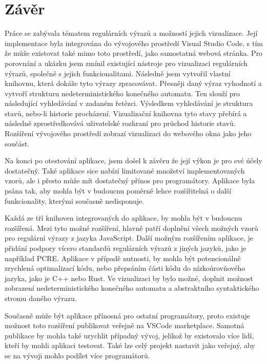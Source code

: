 \chapter{Závěr}\label{sec:Conclusion}

Práce se zabývala tématem regulárních výrazů a možností jejich vizualizace.
Její implementace byla integrována do vývojového prostředí Visual Studio Code, s tím že může existovat také mimo toto prostředí, jako samostatná webová stránka.
Pro porovnání a ukázku jsem zmínil existující nástroje pro vizualizaci regulárních výrazů, společně s jejich funkcionalitami.
Následně jsem vytvořil vlastní knihovnu, která dokáže tyto výrazy zpracovávat.
Přesněji daný výraz vyhodnotí a vytvoří strukturu nedeterministického konečného automatu.
Ten slouží pro následující vyhledávání v zadaném řetězci.
Výsledkem vyhledávání je struktura stavů, nebo-li historie procházení.
Vizualizační knihovna tyto stavy přebírá a následně zprostředkovává uživatelské rozhraní pro průchod historie stavů.
Rozšíření vývojového prostředí zobrazí vizualizaci do webového okna jako jeho součást.

Na konci po otestování aplikace, jsem došel k závěru že její výkon je pro své účely dostatečný.
Také aplikace sice nabízí limitované množství implementovaných vzorů, ale i přesto může mít dostatečný přínos pro programátory.
Aplikace byla psána tak, aby mohla být v budoucnu poměrně lehce rozšířitelná o další funkcionality, kterými současně nedisponuje.

Každá ze tří knihoven integrovaných do aplikace, by mohla být v budoucnu rozšířená.
Mezi tyto možné rozšíření, hlavně patří doplnění všech možných vzorů pro regulární výrazy z jazyka JavaScript.
Další možným rozšířením aplikace, je přidání podpory vícero standardů regulárních výrazů z jiných jazyků, jako je například PCRE.
Aplikace v případě nutnosti, by mohla být potencionálně zrychlená optimalizací kódu, nebo přepsáním části kódu do nízkoúrovňového jazyka, jako je C++ nebo Rust.
Ve vizualizaci by bylo možné, doplnit možnost zobrazení nedeterministického konečného automatu a abstraktního syntaktického stromu daného výrazu.

Současně může být aplikace přínosná pro ostatní programátory, proto existuje možnost toto rozšíření publikovat veřejně na VSCode marketplace.
Samotná publikace by mohla také urychlit případný vývoj, jelikož by existovalo více lidí, kteří by mohli aplikaci testovat.
Také lze celý projekt nastavit jako veřejný, aby se na vývoji mohlo podílet více programátorů.